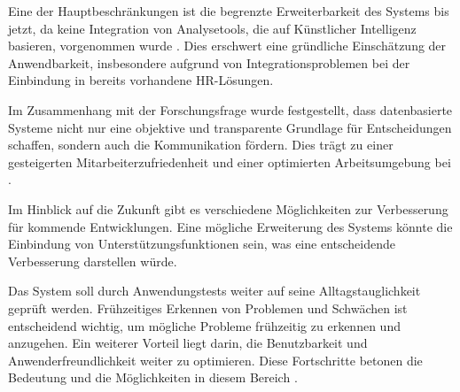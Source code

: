 Eine der Hauptbeschränkungen ist die begrenzte Erweiterbarkeit des Systems bis jetzt, da keine Integration von Analysetools, die auf Künstlicher Intelligenz basieren, vorgenommen wurde \cite{tambe2019artificial}. Dies erschwert eine gründliche Einschätzung der Anwendbarkeit, insbesondere aufgrund von Integrationsproblemen bei der Einbindung in bereits vorhandene HR-Lösungen.

Im Zusammenhang mit der Forschungsfrage wurde festgestellt, dass datenbasierte Systeme nicht nur eine objektive und transparente Grundlage für Entscheidungen schaffen, sondern auch die Kommunikation fördern. Dies trägt zu einer gesteigerten Mitarbeiterzufriedenheit und einer optimierten Arbeitsumgebung bei \cite{boneder2023evaluation}.

Im Hinblick auf die Zukunft gibt es verschiedene Möglichkeiten zur Verbesserung für kommende Entwicklungen. Eine mögliche Erweiterung des Systems könnte die Einbindung von Unterstützungsfunktionen sein, was eine entscheidende Verbesserung darstellen würde. 

Das System soll durch Anwendungstests weiter auf seine Alltagstauglichkeit geprüft werden. Frühzeitiges Erkennen von Problemen und Schwächen ist entscheidend wichtig, um mögliche Probleme frühzeitig zu erkennen und anzugehen. Ein weiterer Vorteil liegt darin, die Benutzbarkeit und Anwenderfreundlichkeit weiter zu optimieren. Diese Fortschritte betonen die Bedeutung und die Möglichkeiten in diesem Bereich \cite{sedlmair2011information}.